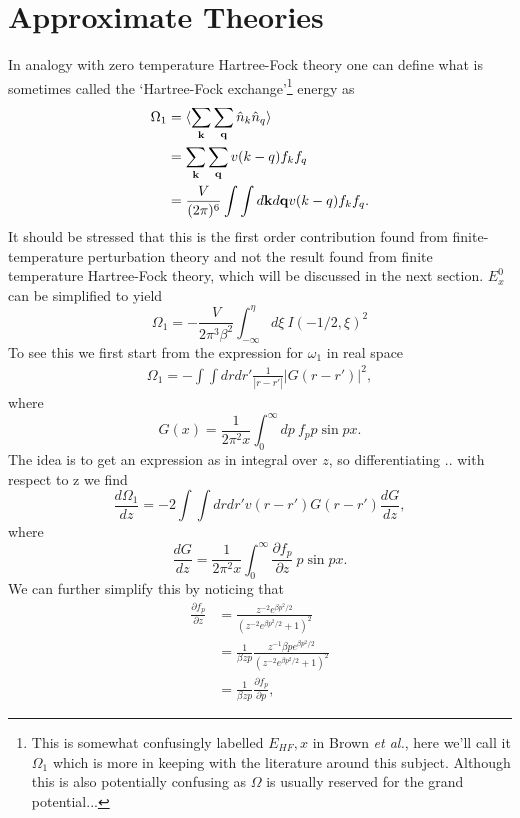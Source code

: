 \documentclass[11pt,twosided]{article}
\begin{document}
\section{Approximate Theories}
In analogy with zero temperature Hartree-Fock theory one can define what is sometimes called the `Hartree-Fock exchange'\footnote{This is somewhat confusingly labelled $E_{HF},x$ in Brown \emph{et al.}, here we'll call it $\Omega_1$ which is more in keeping with the literature around this subject. Although this is also potentially confusing as $\Omega$ is usually reserved for the grand potential...} energy as
\begin{align}
\Omega_1 &= \langle \sum_{\mathbf{k}} \sum_{\mathbf{q}} \hat{n}_k \hat{n}_q \rangle\\
	  &=  \sum_{\mathbf{k}} \sum_{\mathbf{q}} v(k-q) f_k f_q\\
	  &= \frac{V}{(2\pi)^6}\int\int d\mathbf{k}d\mathbf{q} v(k-q) f_k f_q.
\end{align}
It should be stressed that this is the first order contribution found from finite-temperature perturbation theory and not the result found from finite temperature Hartree-Fock theory, which will be discussed in the next section.
$E_x^0$ can be simplified to yield
\begin{equation}
\Omega_1 = -\frac{V}{2\pi^3\beta^2}\int_{-\infty}^{\eta} d\xi \ I(-1/2, \xi)^2
\end{equation}
To see this we first start from the expression for $\omega_1$ in real space
\begin{align}
\Omega_1 = - \int \int dr dr' \frac{1}{|r-r'|} |G(r-r')|^2,
\end{align}
where
\begin{equation}
G(x) = \frac{1}{2\pi^2x}\int_0^{\infty} dp \ f_p p \sin px.
\end{equation}
The idea is to get an expression as in integral over $z$, so differentiating .. with respect to z we find
\begin{equation}
\frac{d\Omega_1}{dz} = - 2\int \int dr dr' v(r-r') G(r-r')\frac{dG}{dz},
\end{equation}
where
\begin{equation}
\frac{dG}{dz} = \frac{1}{2\pi^2x}\int_0^{\infty} \frac{\partial f_p}{\partial z} \ p \sin px.
\end{equation}
We can further simplify this by noticing that
\begin{align}
\frac{\partial f_p}{\partial z} &= \frac{z^{-2} e^{\beta p^2/2}}{(z^{-2} e^{\beta p^2/2}+1)^2}\\
							   &= \frac{1}{ \beta zp}\frac{z^{-1} \beta p e^{\beta p^2/2}}{(z^{-2} e^{\beta p^2/2}+1)^2}\\
							   &= \frac{1}{\beta zp}\frac{\partial f_p}{\partial p},
\end{align}
\end{document}
